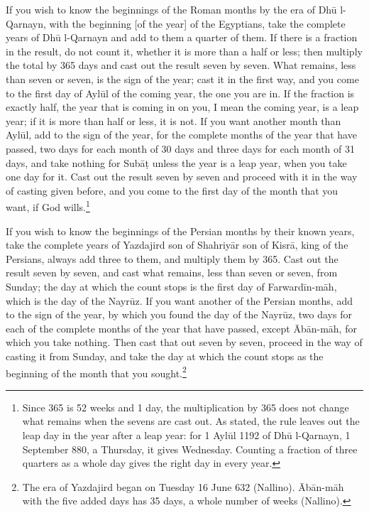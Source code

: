 \documentclass[11pt]{article}
\newcommand{\ArPage}[1]{\marginpar{\footnotesize\color{gray}Ar.\,p.\,#1}}
\begin{document}
\par \ArPage{102}If you wish to know the beginnings of the Roman months by the era of Dhū l-Qarnayn, with the beginning [of the year] of the Egyptians, take the complete years of Dhū l-Qarnayn and add to them a quarter of them. If there is a fraction in the result, do not count it, whether it is more than a half or less; then multiply the total by 365 days and cast out the result seven by seven. What remains, less than seven or seven, is the sign of the year; cast it in the first way, and you come to the first day of Aylūl of the coming year, the one you are in. If the fraction is exactly half, the year that is coming in on you, I mean the coming year, is a leap year; if it is more than half or less, it is not. If you want another month than Aylūl, add to the sign of the year, for the complete months of the year that have passed, two days for each month of 30 days and three days for each month of 31 days, and take nothing for Subāṭ unless the year is a leap year, when you take one day for it. Cast out the result seven by seven and proceed with it in the way of casting given before, and you come to the first day of the month that you want, if God wills.\footnote{Since 365 is 52 weeks and 1 day, the multiplication by 365 does not change what remains when the sevens are cast out. As stated, the rule leaves out the leap day in the year after a leap year: for 1 Aylūl 1192 of Dhū l-Qarnayn, 1 September 880, a Thursday, it gives Wednesday. Counting a fraction of three quarters as a whole day gives the right day in every year.}\par
\par If you wish to know the beginnings of the Persian months by their known years, take the complete years of Yazdajird son of Shahriyār son of Kisrā, king of the Persians, always add three to them, and multiply them by 365. Cast out the result seven by seven, and cast what remains, less than seven or seven, from Sunday; the day at which the count stops is the first day of Farwardīn-māh, which is the day of the Nayrūz. If you want another of the Persian months, add to the sign of the year, by which you found the day of the Nayrūz, two days for each of the complete months of the year that have passed, except Ābān-māh, for which you take nothing. Then cast that out seven by seven, proceed in the way of casting it from Sunday, and take the day at which the count stops as the beginning of the month that you sought.\footnote{The era of Yazdajird began on Tuesday 16 June 632 (Nallino). Ābān-māh with the five added days has 35 days, a whole number of weeks (Nallino).}\par
\end{document}
